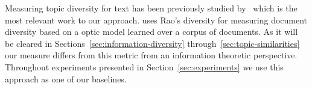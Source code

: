 Measuring topic diversity for text has been previously studied by~\cite{bache:2013} which is the most relevant work to our approach. \citep{bache:2013} uses Rao's diversity \cite{rao:1982} for measuring document diversity based on a optic model learned over a corpus of documents. As it will be cleared in Sections~\ref{sec:information-diversity} through~\ref{sec:topic-similarities} our measure differs from this metric from an information theoretic perspective. Throughout experiments presented in Section~\ref{sec:experiments} we use this approach as one of our baselines.